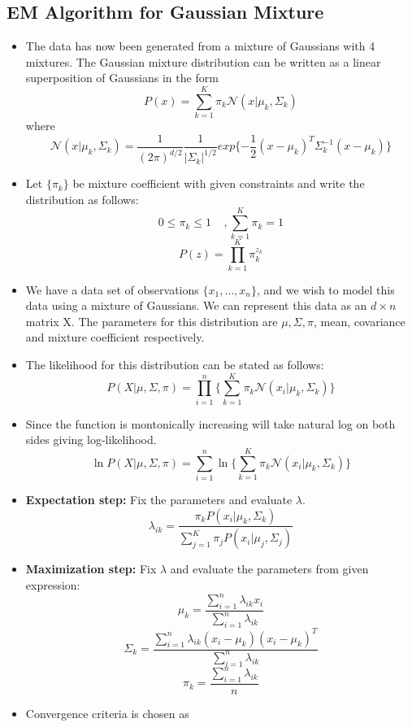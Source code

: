 \documentclass[12pt, a4paper]{article}
\begin{document}
\subsection{EM Algorithm for Gaussian Mixture}
\begin{itemize}
    \item \large The data has now been generated from a mixture of Gaussians with 4 mixtures. The  Gaussian mixture distribution can be written as a linear superposition of Gaussians in the form
    \[P(x)=\sum\limits_{k=1}^{K}\pi_k\mathcal{N}(x|\mu_k,\varSigma_k)\]
    where \hfuzz=5.5pt \[\mathcal{N}(x|\mu_k,\varSigma_k)=\frac{1}{(2\pi)^{d/2}}\frac{1}{|\varSigma_k|^{1/2}}exp\{-\frac{1}{2}(x-\mu_k)^T\varSigma_k^{-1}(x-\mu_k)\}\] 
    \item \large Let $\{\pi_k\}$ be mixture coefficient with given constraints and write the distribution as follows:
    \[0 \leq \pi_k \leq 1\;\;\;\;,\sum\limits_{k=1}^{K}\pi_k=1\]
    \large \[P(z)=\prod\limits_{k=1}^{K}\pi_k^{z_k}\]
    \item \large We have a data set of observations $\{x_1,\dots,x_n\}$, and we wish to model this data using a mixture of Gaussians. We can represent this data as an $d \times n$ matrix X. The parameters for this distribution are $\mu,\varSigma ,\pi$, mean, covariance and mixture coefficient respectively.
    \item The likelihood for this distribution can be stated as follows:
    \[P(X|\mu,\varSigma,\pi)=\prod\limits_{i=1}^{n}\{\sum\limits_{k=1}^{K}\pi_k\mathcal{N}(x_i|\mu_k,\varSigma_k)\}\]
    \item \large Since the function is montonically increasing will take natural log on both sides giving log-likelihood.
    \[\ln P(X|\mu,\varSigma,\pi)=\sum\limits_{i=1}^{n}\ln\{\sum\limits_{k=1}^{K}\pi_k\mathcal{N}(x_i|\mu_k,\varSigma_k)\}\] 
    \item \large \textbf{Expectation step:}  Fix the parameters and evaluate $\lambda$.
    \[\lambda_{ik}=\frac{\pi_kP(x_i|\mu_k,\varSigma_k)}{\sum\limits_{j=1}^{K}\pi_jP(x_i|\mu_j,\varSigma_j)}\]
    \item \large \textbf{Maximization step:} Fix $\lambda$ and evaluate the parameters from given expression:
    \[\mu_k=\frac{\sum\limits_{i=1}^{n}\lambda_{ik}x_{i}}{\sum\limits_{i=1}^{n}\lambda_{ik}}\]
    \[\varSigma_k=\frac{\sum\limits_{i=1}^{n}\lambda_{ik}(x_i-\mu_k)(x_i-\mu_k)^T}{\sum\limits_{i=1}^{n}\lambda_{ik}}\]
    \[\pi_k=\frac{\sum\limits_{i=1}^{n}\lambda_{ik}}{n}\]
    \item Convergence criteria is chosen as 

\end{itemize}
\end{document}
